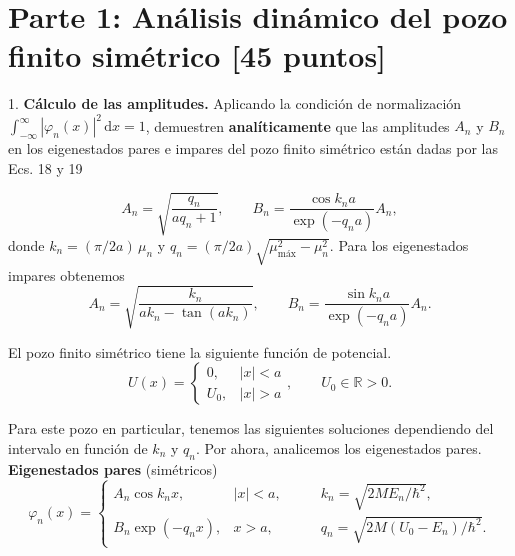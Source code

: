 \section{Parte 1: Análisis dinámico del pozo finito simétrico [45 puntos]}


\begin{pregunta}{1.}
\textbf{Cálculo de las amplitudes.} Aplicando la condición de normalización $\int_{-\infty}^{\infty} |\varphi_n(x)|^2 \, \mathrm{d}x = 1$, demuestren \textbf{analíticamente} que las amplitudes $A_n$ y $B_n$ en los eigenestados pares e impares del pozo finito simétrico están dadas por las Ecs. 18 y 19

\begin{equation}
A_n = \sqrt{\frac{q_n}{a q_n + 1}}, \qquad B_n = \frac{\cos k_n a}{\exp(-q_n a)} A_n, \tag{18}
\end{equation}
donde $k_n = (\pi/2a)\,\mu_n$ y $q_n = (\pi/2a)\sqrt{\mu_{\text{máx}}^2 - \mu_n^2}$. Para los eigenestados impares obtenemos
\begin{equation}
A_n = \sqrt{\frac{k_n}{a k_n - \tan(a k_n)}}, \qquad B_n = \frac{\sin k_n a}{\exp(-q_n a)} A_n. \tag{19}
\end{equation}
\end{pregunta}

El pozo finito simétrico tiene la siguiente función de potencial.
\begin{equation*}
U\left(x\right)=\left\{\begin{array}{ll}0, & \left|x\right|<a\\ U_0, & \left|x\right|>a\end{array}\right., \qquad U_0\in\mathbb{R}>0.
\end{equation*}

Para este pozo en particular, tenemos las siguientes soluciones dependiendo del intervalo en función de $k_n$ y $q_n$. Por ahora, analicemos los eigenestados pares.  
\textbf{Eigenestados pares} (simétricos)
\begin{equation*}
\varphi_n\left(x\right)=\left\{\begin{array}{lll}A_n\cos k_n x, & \left|x\right|<a, \qquad & k_n=\sqrt{2ME_n/\hbar^2},\\ B_n\exp\left(-q_n x\right), & x>a, \qquad & q_n=\sqrt{2M\left(U_0-E_n\right)/\hbar^2}.\end{array}\right.
\end{equation*}


